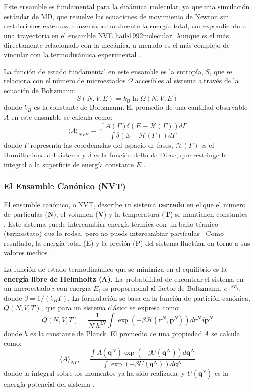 Este ensamble es fundamental para la dinámica molecular, ya que una simulación estándar de MD, que resuelve las ecuaciones de movimiento de Newton sin restricciones externas, conserva naturalmente la energía total, correspondiendo a una trayectoria en el ensamble NVE \cite[97, 253]{zhou2022molecular}{haile1992molecular}. Aunque es el más directamente relacionado con la mecánica, a menudo es el más complejo de vincular con la termodinámica experimental \cite[357]{haile1992molecular}.

La función de estado fundamental en este ensamble es la entropía, $S$, que se relaciona con el número de microestados $\Omega$ accesibles al sistema a través de la ecuación de Boltzmann:
$$ S(N, V, E) = k_B \ln \Omega(N, V, E) $$
donde $k_B$ es la constante de Boltzmann. El promedio de una cantidad observable $A$ en este ensamble se calcula como:
$$ \langle A \rangle_{NVE} = \frac{\int A(\Gamma) \delta(E - \mathcal{H}(\Gamma)) d\Gamma}{\int \delta(E - \mathcal{H}(\Gamma)) d\Gamma} $$
donde $\Gamma$ representa las coordenadas del espacio de fases, $\mathcal{H}(\Gamma)$ es el Hamiltoniano del sistema y $\delta$ es la función delta de Dirac, que restringe la integral a la superficie de energía constante $E$ \cite[68]{allen2012computer}.

\subsubsection{El Ensamble Canónico (NVT)}

El ensamble canónico, o NVT, describe un sistema \textbf{cerrado} en el que el número de partículas (\textbf{N}), el volumen (\textbf{V}) y la temperatura (\textbf{T}) se mantienen constantes \cite[98]{zhou2022molecular}. Este sistema puede intercambiar energía térmica con un baño térmico (termostato) que lo rodea, pero no puede intercambiar partículas \cite[98]{zhou2022molecular}. Como resultado, la energía total (E) y la presión (P) del sistema fluctúan en torno a sus valores medios \cite[98]{zhou2022molecular}.

La función de estado termodinámico que se minimiza en el equilibrio es la \textbf{energía libre de Helmholtz (A)}. La probabilidad de encontrar el sistema en un microestado $i$ con energía $E_i$ es proporcional al factor de Boltzmann, $e^{-\beta E_i}$, donde $\beta = 1/(k_B T)$. La formulación se basa en la función de partición canónica, $Q(N,V,T)$, que para un sistema clásico se expresa como:
$$ Q(N,V,T) = \frac{1}{N!h^{3N}} \int \exp(-\beta \mathcal{H}(\mathbf{r}^N, \mathbf{p}^N)) d\mathbf{r}^N d\mathbf{p}^N $$
donde $h$ es la constante de Planck. El promedio de una propiedad $A$ se calcula como:
$$ \langle A \rangle_{NVT} = \frac{\int A(\mathbf{q}^N) \exp(-\beta U(\mathbf{q}^N)) d\mathbf{q}^N}{\int \exp(-\beta U(\mathbf{q}^N)) d\mathbf{q}^N} $$
donde la integral sobre los momentos ya ha sido realizada, y $U(\mathbf{q}^N)$ es la energía potencial del sistema \cite[105]{allen2012computer}.

